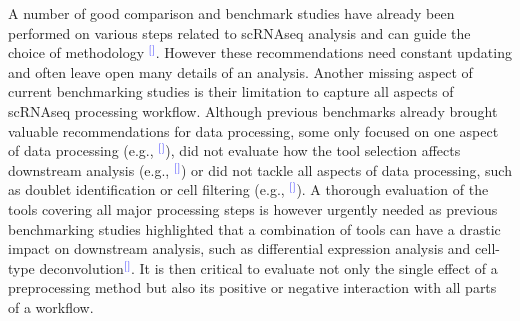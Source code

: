 \documentclass[11pt]{article}
\renewcommand{\cite}[1]{\textcolor{Blue}{$^[$\supercite{#1}$^]$}}
\begin{document}
A number of good comparison and benchmark studies have already been performed on various steps related to scRNAseq analysis and can guide the choice of methodology \cite{CobosDeconvolution2020, colePerformance2018, DalMolinDE2017, duoClustering2018, freytagComparison2018, HeiserDimred2019, JaakkolaDE2017, SonesonDE2018, SunDimRed2019, tianMixology2018, TranBatch2020, TsuyuzakiPCA2020, viethSystematic2019, WangDE2019, YipHVGs2018, ZhangImput2018}. However these recommendations need constant updating and often leave open many details of an analysis. Another missing aspect of current benchmarking studies is their limitation to capture all aspects of scRNAseq processing workflow. Although previous benchmarks already brought valuable recommendations for data processing, some only focused on one aspect of data processing (e.g., \cite{SunDimRed2019}), did not evaluate how the tool selection affects downstream analysis (e.g., \cite{TsuyuzakiPCA2020}) or did not tackle all aspects of data processing, such as doublet identification or cell filtering (e.g., \cite{viethSystematic2019}). A thorough evaluation of the tools covering all major processing steps is however urgently needed as previous benchmarking studies highlighted that a combination of tools can have a drastic impact on downstream analysis, such as differential expression analysis and cell-type deconvolution\cite{viethSystematic2019,CobosDeconvolution2020}. It is then critical to evaluate not only the single effect of a preprocessing method but also its positive or negative interaction with all parts of a workflow.
\end{document}
